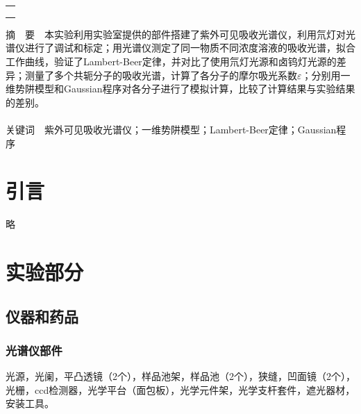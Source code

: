 \documentclass[12pt]{article}
\begin{document}
\begin{titlepage}
\begin{center}
\begin{tabular}{cp{5cm}}
            \end{tabular}
            \begin{tabular*}{\textwidth}{c}
                \\ %
                \\ %
                \\ %
                \\ %
                \hline %
            \end{tabular*}
        \end{center}
        \textsf{摘\ \ 要}\ \ 本实验利用实验室提供的部件搭建了紫外可见吸收光谱仪，利用氘灯对光谱仪进行了调试和标定；用光谱仪测定了同一物质不同浓度溶液的吸收光谱，拟合工作曲线，验证了Lambert-Beer定律，并对比了使用氘灯光源和卤钨灯光源的差异；测量了多个共轭分子的吸收光谱，计算了各分子的摩尔吸光系数$\varepsilon$；分别用一维势阱模型和Gaussian程序对各分子进行了模拟计算，比较了计算结果与实验结果的差别。
        \\
        \\
        \textsf{关键词}\ \ 紫外可见吸收光谱仪；一维势阱模型；Lambert-Beer定律；Gaussian程序
    \end{titlepage}

    \section{引言}
	略
               
\vbox{}        
    \section{实验部分}
    	\subsection{仪器和药品}
    	\subsubsection{光谱仪部件}
    	光源，光阑，平凸透镜（2个），样品池架，样品池（2个），狭缝，凹面镜（2个），光栅，ccd检测器，光学平台（面包板），光学元件架，光学支杆套件，遮光器材，安装工具。
\end{document}
